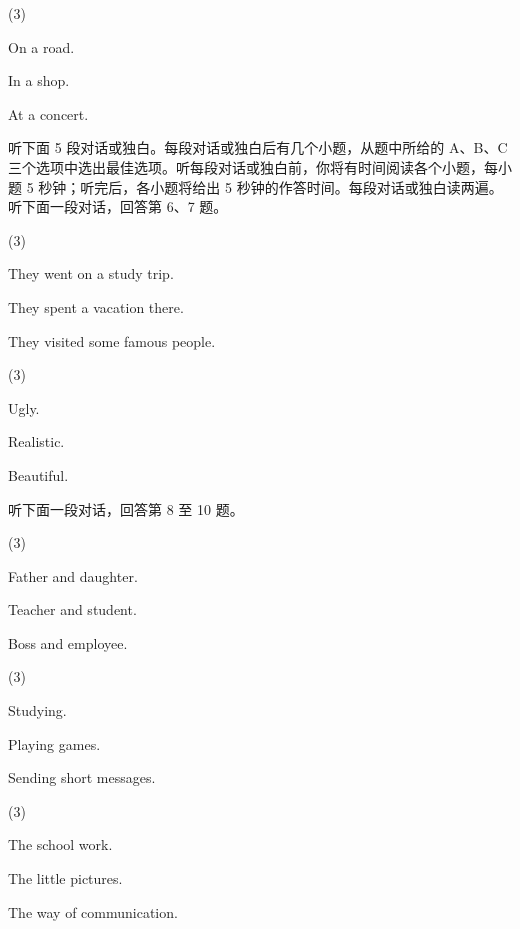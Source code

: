 \documentclass{英语试卷}
\begin{document}
\begin{choices}(3)
  \item On a road.
  \item In a shop.
  \item At a concert.
\end{choices}
\par 听下面 5 段对话或独白。每段对话或独白后有几个小题，从题中所给的 A、B、C 三个选项中选出最佳选项。听每段对话或独白前，你将有时间阅读各个小题，每小题 5 秒钟；听完后，各小题将给出 5 秒钟的作答时间。每段对话或独白读两遍。 听下面一段对话，回答第 6、7 题。\par
{}
\begin{choices}(3)
  \item They went on a study trip.
  \item They spent a vacation there.
  \item They visited some famous people.
\end{choices}
\begin{choices}(3)
  \item Ugly.
  \item Realistic.
  \item Beautiful.
\end{choices}
\par 听下面一段对话，回答第 8 至 10 题。\par
{}
\begin{choices}(3)
  \item Father and daughter.
  \item Teacher and student.
  \item Boss and employee.
\end{choices}
\begin{choices}(3)
  \item Studying.
  \item Playing games.
  \item Sending short messages.
\end{choices}
\begin{choices}(3)
  \item The school work.
  \item The little pictures.
  \item The way of communication.
\end{choices}
\end{document}

